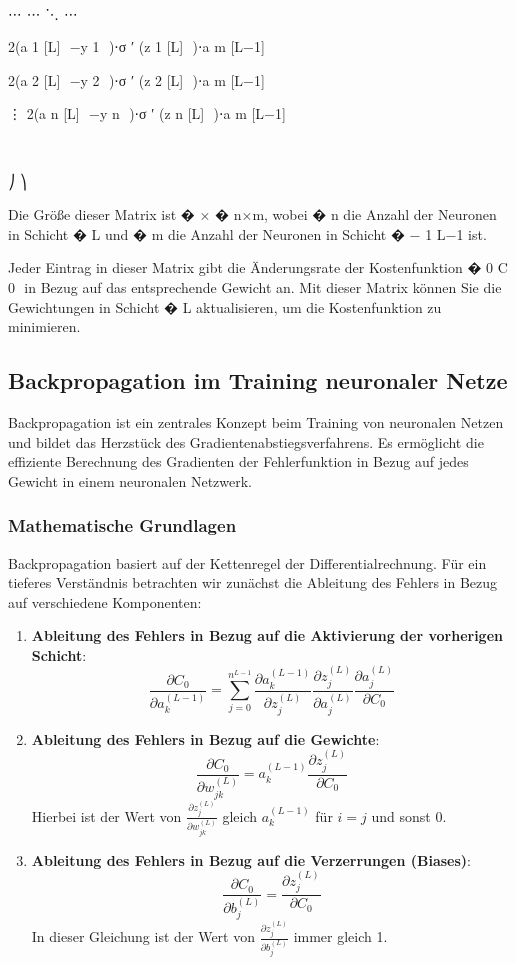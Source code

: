 ​
  
⋯
⋯
⋱
⋯
​
  
2(a 
1
[L]
​
 −y 
1
​
 )⋅σ 
′
 (z 
1
[L]
​
 )⋅a 
m
[L−1]
​
 
2(a 
2
[L]
​
 −y 
2
​
 )⋅σ 
′
 (z 
2
[L]
​
 )⋅a 
m
[L−1]
​
 
⋮
2(a 
n
[L]
​
 −y 
n
​
 )⋅σ 
′
 (z 
n
[L]
​
 )⋅a 
m
[L−1]
​
 
​
  
⎠
⎞
​
 

Die Größe dieser Matrix ist 
�
×
�
n×m, wobei 
�
n die Anzahl der Neuronen in Schicht 
�
L und 
�
m die Anzahl der Neuronen in Schicht 
�
−
1
L−1 ist.

Jeder Eintrag in dieser Matrix gibt die Änderungsrate der Kostenfunktion 
�
0
C 
0
​
  in Bezug auf das entsprechende Gewicht an. Mit dieser Matrix können Sie die Gewichtungen in Schicht 
�
L aktualisieren, um die Kostenfunktion zu minimieren.


\subsection{Backpropagation im Training neuronaler Netze}

Backpropagation ist ein zentrales Konzept beim Training von neuronalen Netzen und bildet das Herzstück des Gradientenabstiegsverfahrens. Es ermöglicht die effiziente Berechnung des Gradienten der Fehlerfunktion in Bezug auf jedes Gewicht in einem neuronalen Netzwerk.

\subsubsection{Mathematische Grundlagen}

Backpropagation basiert auf der Kettenregel der Differentialrechnung. Für ein tieferes Verständnis betrachten wir zunächst die Ableitung des Fehlers in Bezug auf verschiedene Komponenten:

\begin{enumerate}
    \item \textbf{Ableitung des Fehlers in Bezug auf die Aktivierung der vorherigen Schicht}:
    \[
    \frac{\partial C_0}{\partial a_k^{(L-1)}} = \sum_{j=0}^{n^{L-1}} \frac{\partial a_k^{(L-1)}}{\partial z_j^{(L)}} \frac{\partial z_j^{(L)}}{\partial a_j^{(L)}} \frac{\partial a_j^{(L)}}{\partial C_0}
    \]

    \item \textbf{Ableitung des Fehlers in Bezug auf die Gewichte}:
    \[
    \frac{\partial C_0}{\partial w_{jk}^{(L)}} = a_k^{(L-1)} \frac{\partial z_j^{(L)}}{\partial C_0}
    \]
    Hierbei ist der Wert von \(\frac{\partial z_j^{(L)}}{\partial w_{jk}^{(L)}}\) gleich \(a_k^{(L-1)}\) für \(i=j\) und sonst 0.

    \item \textbf{Ableitung des Fehlers in Bezug auf die Verzerrungen (Biases)}:
    \[
    \frac{\partial C_0}{\partial b_j^{(L)}} = \frac{\partial z_j^{(L)}}{\partial C_0}
    \]
    In dieser Gleichung ist der Wert von \(\frac{\partial z_j^{(L)}}{\partial b_j^{(L)}}\) immer gleich 1.
\end{enumerate}

